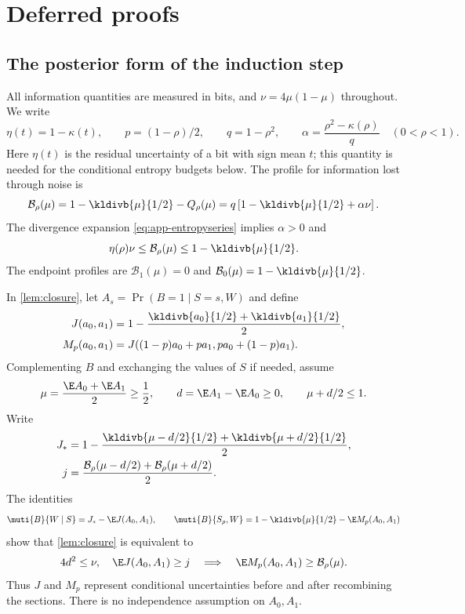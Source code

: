 \section{Deferred proofs}

\subsection{The posterior form of the induction step}\label{app:closure}
All information quantities are measured in bits, and $\nu=4\mu(1-\mu)$ throughout. We write
\[
 \eta(t)=1-\kappa(t),\qquad p=(1-\rho)/2,
 \qquad q=1-\rho^2,\qquad
 \alpha=\frac{\rho^2-\kappa(\rho)}q\quad(0<\rho<1).
\]
Here $\eta(t)$ is the residual uncertainty of a bit with sign mean $t$;
this quantity is needed for the conditional entropy budgets below. The
profile for information lost through noise is
\[
 \mathcal B_\rho(\mu)
 =1-\kldivb{\mu}{1/2}-Q_\rho(\mu)
 =q\left[1-\kldivb{\mu}{1/2}+\alpha\nu\right].
\]
The divergence expansion \eqref{eq:app-entropyseries} implies $\alpha>0$ and
\[
 \eta(\rho)\nu\le\mathcal B_\rho(\mu)\le1-\kldivb{\mu}{1/2}.
\]
The endpoint profiles are $\mathcal B_1(\mu)=0$ and
$\mathcal B_0(\mu)=1-\kldivb{\mu}{1/2}$.

In \autoref{lem:closure}, let
$A_s=\Pr(B=1\mid S=s,W)$ and define
\[
\begin{aligned}
 J(a_0,a_1)&=1-\frac{\kldivb{a_0}{1/2}+\kldivb{a_1}{1/2}}2,\\
 M_p(a_0,a_1)&=J((1-p)a_0+pa_1,pa_0+(1-p)a_1).
\end{aligned}
\]
Complementing $B$ and exchanging the values of $S$ if needed, assume
\[
 \mu=\frac{\E A_0+\E A_1}{2}\ge\frac12,\qquad
 d=\E A_1-\E A_0\ge0,
 \qquad \mu+d/2\le1.
\]
Write
\[
\begin{aligned}
 J_* &=1-\frac{\kldivb{\mu-d/2}{1/2}+\kldivb{\mu+d/2}{1/2}}2,\\
 j&=\frac{\mathcal B_\rho(\mu-d/2)+\mathcal B_\rho(\mu+d/2)}2.
\end{aligned}
\]
The identities
\[
 \muti{B}{W\mid S}=J_*-\E J(A_0,A_1),\qquad
 \muti{B}{S_\rho,W}=1-\kldivb{\mu}{1/2}-\E M_p(A_0,A_1)
\]
show that \autoref{lem:closure} is equivalent to
\begin{equation}\label{eq:app-local}
 4d^2\le\nu,\quad \E J(A_0,A_1)\ge j
 \quad\Longrightarrow\quad
 \E M_p(A_0,A_1)\ge\mathcal B_\rho(\mu).
\end{equation}
Thus $J$ and $M_p$ represent conditional uncertainties before and after
recombining the sections. There is no independence assumption on $A_0,A_1$.

